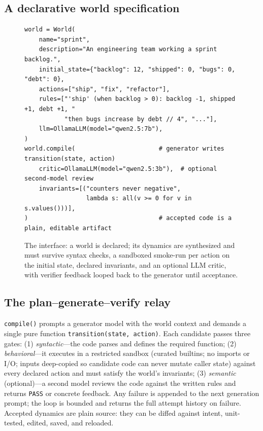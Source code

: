 \documentclass[11pt]{article}
\begin{document}
\subsection{A declarative world specification}\label{sec:language}
\begin{figure}[htb]\centering
\begin{tcolorbox}[policycard, cardcol=cardblue,
  title=A world declaration and its verified compilation, width=0.94\linewidth]
\begin{lstlisting}[style=housespecyamlbare]
world = World(
    name="sprint",
    description="An engineering team working a sprint backlog.",
    initial_state={"backlog": 12, "shipped": 0, "bugs": 0, "debt": 0},
    actions=["ship", "fix", "refactor"],
    rules=["'ship' (when backlog > 0): backlog -1, shipped +1, debt +1, "
           "then bugs increase by debt // 4", "..."],
    llm=OllamaLLM(model="qwen2.5:7b"),
)
world.compile(                       # generator writes transition(state, action)
    critic=OllamaLLM(model="qwen2.5:3b"),  # optional second-model review
    invariants=[("counters never negative",
                 lambda s: all(v >= 0 for v in s.values()))],
)                                    # accepted code is a plain, editable artifact
\end{lstlisting}
\end{tcolorbox}
\caption{The interface: a world is declared; its dynamics are
synthesized and must survive syntax checks, a sandboxed smoke-run per action
on the initial state, declared invariants, and an optional LLM critic, with
verifier feedback looped back to the generator until acceptance.}
\label{fig:spec}
\end{figure}

\subsection{The plan--generate--verify relay}
\texttt{compile()} prompts a generator model with the world context and
demands a single pure function \texttt{transition(state, action)}. Each
candidate passes three gates: (1) \emph{syntactic}---the code parses and
defines the required function; (2) \emph{behavioral}---it executes in a
restricted sandbox (curated builtins; no imports or I/O; inputs deep-copied so
candidate code can never mutate caller state) against every declared action
and must satisfy the world's invariants; (3) \emph{semantic}
(optional)---a second model reviews the code against the written rules and
returns \texttt{PASS} or concrete feedback. Any failure is appended to the
next generation prompt; the loop is bounded and returns the full attempt
history on failure. Accepted dynamics are plain source: they can be diffed
against intent, unit-tested, edited, saved, and reloaded.
\end{document}

